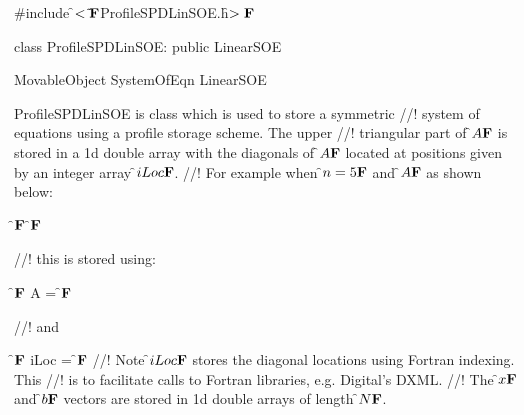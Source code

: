 

\indent \#include \f$<\tilde{ }{\bf F}$ProfileSPDLinSOE.h\f$>{\bf F}$

\indent class ProfileSPDLinSOE: public LinearSOE

\indent MovableObject
\indent\indent SystemOfEqn
\indent\indent\indent LinearSOE
\indent\indent\indent{}

\indent ProfileSPDLinSOE is class which is used to store a symmetric
//! system of equations using a profile storage scheme. The upper
//! triangular part of \f$A{\bf F}$ is stored in a 1d double array with the diagonals of
\f$A{\bf F}$ located at positions given by an integer array \f$iLoc{\bf F}$. 
//! For example when \f$n=5{\bf F}$ and \f$A{\bf F}$ as shown below:

\f${\bf F}$
\f${\bf F}$

//! this is stored using:


\f${\bf F}$ A =
\f${\bf F}$

//! and 

\f${\bf F}$ iLoc =
\f${\bf F}$
//! Note \f$iLoc{\bf F}$ stores the diagonal locations using Fortran indexing. This
//! is to facilitate calls to Fortran libraries, e.g. Digital's DXML.
//! The \f$x{\bf F}$ and \f$b{\bf F}$ vectors are stored in 1d double arrays of length \f$N{\bf F}$.


